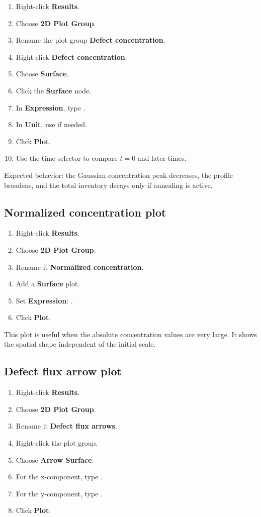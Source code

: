 \documentclass[11pt]{article}
\newcommand{\code}[1]{\texttt{\detokenize{#1}}}
\begin{document}
\begin{enumerate}[leftmargin=2em]
\item Right-click \textbf{Results}.
\item Choose \textbf{2D Plot Group}.
\item Rename the plot group \textbf{Defect concentration}.
\item Right-click \textbf{Defect concentration}.
\item Choose \textbf{Surface}.
\item Click the \textbf{Surface} node.
\item In \textbf{Expression}, type \code{C}.
\item In \textbf{Unit}, use \code{1/m^3} if needed.
\item Click \textbf{Plot}.
\item Use the time selector to compare $t=0$ and later times.
\end{enumerate}

Expected behavior: the Gaussian concentration peak decreases, the profile broadens, and the total inventory decays only if annealing is active.

\subsection{Normalized concentration plot}

\begin{enumerate}[leftmargin=2em]
\item Right-click \textbf{Results}.
\item Choose \textbf{2D Plot Group}.
\item Rename it \textbf{Normalized concentration}.
\item Add a \textbf{Surface} plot.
\item Set \textbf{Expression}: \code{Crel}.
\item Click \textbf{Plot}.
\end{enumerate}

This plot is useful when the absolute concentration values are very large. It shows the spatial shape independent of the initial scale.

\subsection{Defect flux arrow plot}

\begin{enumerate}[leftmargin=2em]
\item Right-click \textbf{Results}.
\item Choose \textbf{2D Plot Group}.
\item Rename it \textbf{Defect flux arrows}.
\item Right-click the plot group.
\item Choose \textbf{Arrow Surface}.
\item For the x-component, type \code{Jcx}.
\item For the y-component, type \code{Jcy}.
\item Click \textbf{Plot}.
\end{enumerate}
\end{document}
